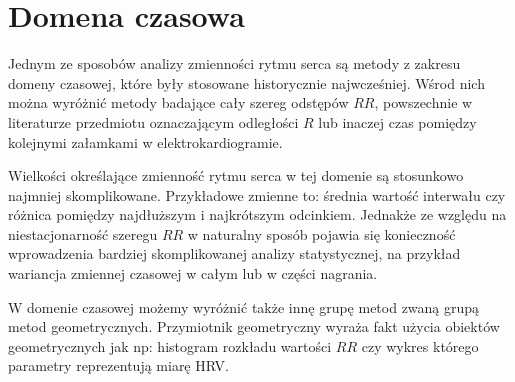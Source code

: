 \section{Domena czasowa}

Jednym ze sposobów analizy zmienności rytmu serca są metody z zakresu domeny czasowej,
które były stosowane historycznie najwcześniej. 
Wśrod nich można wyróżnić metody
badające cały szereg odstępów $RR$, powszechnie w literaturze przedmiotu oznaczającym
odległości $R$ lub inaczej czas pomiędzy kolejnymi załamkami w elektrokardiogramie.

Wielkości określające zmienność rytmu serca w tej domenie są stosunkowo najmniej
skomplikowane. Przykładowe zmienne to: średnia wartość interwału czy różnica pomiędzy
najdłuższym i najkrótszym odcinkiem. Jednakże ze względu na niestacjonarność szeregu $RR$
w naturalny sposób pojawia się konieczność wprowadzenia bardziej skomplikowanej analizy
statystycznej, na przykład wariancja zmiennej czasowej w całym lub w części nagrania.

W domenie czasowej możemy wyróżnić także innę grupę metod zwaną grupą metod geometrycznych.
Przymiotnik geometryczny wyraża fakt użycia obiektów geometrycznych jak np:
histogram rozkładu wartości $RR$ czy wykres \PP{} którego parametry reprezentują miarę HRV. 








